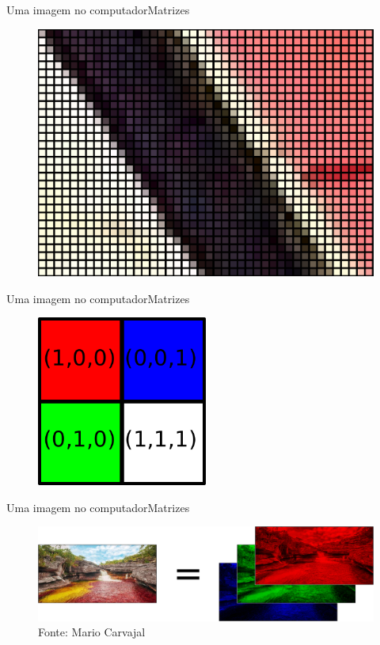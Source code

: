 \documentclass{beamer}
\begin{document}
\begin{frame}{Uma imagem no computador}{Matrizes}
    \begin{figure}
        \centering   
        \includegraphics[scale=0.2]{figs/maceio-zoom2.png}
    \end{figure}
\end{frame}

\begin{frame}{Uma imagem no computador}{Matrizes}
    \begin{figure}
        \centering   
        \includegraphics[width=0.5\textwidth]{figs/imagem-matriz.pdf}
    \end{figure}
\end{frame}

\begin{frame}{Uma imagem no computador}{Matrizes}
    \begin{figure}
        \centering   
        \includegraphics[width=\textwidth]{figs/canais-de-cor2.png}
        \caption{Fonte: Mario Carvajal}
    \end{figure}
\end{frame}
\end{document}
